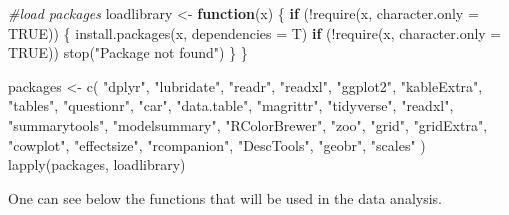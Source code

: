 \documentclass[
]{article}
\newenvironment{Shaded}{\begin{snugshade}}{\end{snugshade}}
\newcommand{\AttributeTok}[1]{\textcolor[rgb]{0.77,0.63,0.00}{#1}}
\newcommand{\CommentTok}[1]{\textcolor[rgb]{0.56,0.35,0.01}{\textit{#1}}}
\newcommand{\ConstantTok}[1]{\textcolor[rgb]{0.00,0.00,0.00}{#1}}
\newcommand{\ControlFlowTok}[1]{\textcolor[rgb]{0.13,0.29,0.53}{\textbf{#1}}}
\newcommand{\FunctionTok}[1]{\textcolor[rgb]{0.00,0.00,0.00}{#1}}
\newcommand{\NormalTok}[1]{#1}
\newcommand{\OtherTok}[1]{\textcolor[rgb]{0.56,0.35,0.01}{#1}}
\newcommand{\SpecialCharTok}[1]{\textcolor[rgb]{0.00,0.00,0.00}{#1}}
\newcommand{\StringTok}[1]{\textcolor[rgb]{0.31,0.60,0.02}{#1}}
\begin{document}
\begin{Shaded}
\begin{Highlighting}[]
\CommentTok{\#load packages}
\NormalTok{loadlibrary }\OtherTok{\textless{}{-}} \ControlFlowTok{function}\NormalTok{(x) \{}
  \ControlFlowTok{if}\NormalTok{ (}\SpecialCharTok{!}\FunctionTok{require}\NormalTok{(x, }\AttributeTok{character.only =} \ConstantTok{TRUE}\NormalTok{)) \{}
    \FunctionTok{install.packages}\NormalTok{(x, }\AttributeTok{dependencies =}\NormalTok{ T)}
    \ControlFlowTok{if}\NormalTok{ (}\SpecialCharTok{!}\FunctionTok{require}\NormalTok{(x, }\AttributeTok{character.only =} \ConstantTok{TRUE}\NormalTok{))}
      \FunctionTok{stop}\NormalTok{(}\StringTok{"Package not found"}\NormalTok{)}
\NormalTok{  \}}
\NormalTok{\}}

\NormalTok{packages }\OtherTok{\textless{}{-}}
  \FunctionTok{c}\NormalTok{(}
    \StringTok{"dplyr"}\NormalTok{,}
    \StringTok{"lubridate"}\NormalTok{,}
    \StringTok{"readr"}\NormalTok{,}
    \StringTok{"readxl"}\NormalTok{,}
    \StringTok{"ggplot2"}\NormalTok{,}
    \StringTok{"kableExtra"}\NormalTok{,}
    \StringTok{"tables"}\NormalTok{,}
    \StringTok{"questionr"}\NormalTok{,}
    \StringTok{"car"}\NormalTok{,}
    \StringTok{"data.table"}\NormalTok{,}
    \StringTok{"magrittr"}\NormalTok{,}
    \StringTok{"tidyverse"}\NormalTok{,}
    \StringTok{"readxl"}\NormalTok{,}
    \StringTok{"summarytools"}\NormalTok{,}
    \StringTok{"modelsummary"}\NormalTok{,}
    \StringTok{"RColorBrewer"}\NormalTok{,}
    \StringTok{"zoo"}\NormalTok{,}
    \StringTok{"grid"}\NormalTok{,}
    \StringTok{"gridExtra"}\NormalTok{,}
    \StringTok{"cowplot"}\NormalTok{,}
    \StringTok{"effectsize"}\NormalTok{,}
    \StringTok{"rcompanion"}\NormalTok{,}
    \StringTok{"DescTools"}\NormalTok{,}
    \StringTok{"geobr"}\NormalTok{,}
    \StringTok{"scales"}
\NormalTok{  )}
\FunctionTok{lapply}\NormalTok{(packages, loadlibrary)}
\end{Highlighting}
\end{Shaded}

One can see below the functions that will be used in the data analysis.
\end{document}
